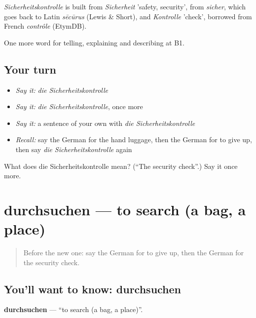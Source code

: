 \begin{cousinweb}
\emph{Sicherheitskontrolle} is built from \emph{Sicherheit} 'safety, security', from \emph{sicher}, which goes back to Latin \emph{sēcūrus} (Lewis \& Short), and \emph{Kontrolle} 'check', borrowed from French \emph{contrôle} (EtymDB).
\end{cousinweb}

\begin{grammarlens}[title={What you've built}]
One more word for telling, explaining and describing at B1.
\end{grammarlens}

\subsection*{Your turn}
\begin{itemize}
\raggedright
  \item \emph{Say it:} \emph{die Sicherheitskontrolle}
  \item \emph{Say it:} \emph{die Sicherheitskontrolle}, once more
  \item \emph{Say it:} a sentence of your own with \emph{die Sicherheitskontrolle}
  \item \emph{Recall:} say the German for the hand luggage, then the German for to give up, then say \emph{die Sicherheitskontrolle} again
\end{itemize}

\begin{tcolorbox}[breakable,colback=teal!4,colframe=teal!35!black,title={Before you move on}]
What does die Sicherheitskontrolle mean? (\textquotedblleft{}The security check\textquotedblright{}.) Say it once more.
\end{tcolorbox}
\section[durchsuchen]{durchsuchen — to search (a bag, a place)}

\label{lesson:GE-C417-durchsuchen}



\begin{quote}
Before the new one: say the German for to give up, then the German for the security check.
\end{quote}

\subsection*{You'll want to know: durchsuchen}
\textbf{durchsuchen} — \textquotedblleft{}to search (a bag, a place)\textquotedblright{}.

